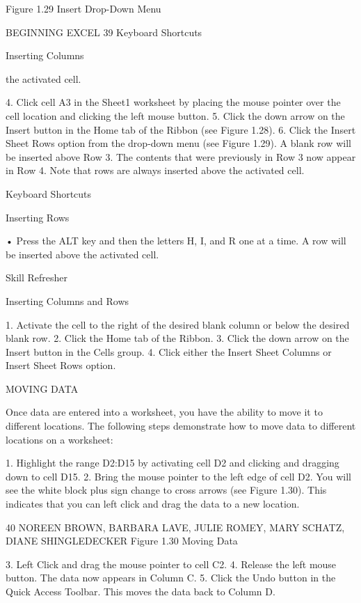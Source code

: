 Figure 1.29 Insert Drop-Down Menu




BEGINNING EXCEL 39
Keyboard Shortcuts


Inserting Columns

the activated cell.



4. Click cell A3 in the Sheet1 worksheet by placing the mouse pointer over the cell location and
clicking the left mouse button.
5. Click the down arrow on the Insert button in the Home tab of the Ribbon (see Figure 1.28).
6. Click the Insert Sheet Rows option from the drop-down menu (see Figure 1.29). A blank row
will be inserted above Row 3. The contents that were previously in Row 3 now appear in Row 4.
Note that rows are always inserted above the activated cell.


Keyboard Shortcuts


Inserting Rows

• Press the ALT key and then the letters H, I, and R one at a time. A row will be inserted above the activated
cell.




Skill Refresher


Inserting Columns and Rows

1. Activate the cell to the right of the desired blank column or below the desired blank row.
2. Click the Home tab of the Ribbon.
3. Click the down arrow on the Insert button in the Cells group.
4. Click either the Insert Sheet Columns or Insert Sheet Rows option.



MOVING DATA

Once data are entered into a worksheet, you have the ability to move it to different locations. The
following steps demonstrate how to move data to different locations on a worksheet:

1. Highlight the range D2:D15 by activating cell D2 and clicking and dragging down to cell D15.
2. Bring the mouse pointer to the left edge of cell D2. You will see the white block plus sign change
to cross arrows (see Figure 1.30). This indicates that you can left click and drag the data to a new
location.


40 NOREEN BROWN, BARBARA LAVE, JULIE ROMEY, MARY SCHATZ, DIANE SHINGLEDECKER
Figure 1.30 Moving Data




3. Left Click and drag the mouse pointer to cell C2.
4. Release the left mouse button. The data now appears in Column C.
5. Click the Undo button in the Quick Access Toolbar. This moves the data back to Column D.



